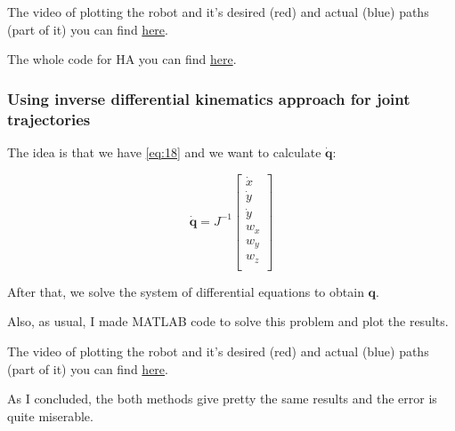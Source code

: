 \documentclass[12pt, a4paper]{report}
\begin{document}
The video of plotting the robot and it's desired (red) and actual (blue) paths (part of it) you can find \href{https://drive.google.com/open?id=1xH5_-XHiQtQv5W_jp0Rq1UXxTakYNbU7}{here}.

The whole code for HA you can find \href{https://github.com/Terminateit/HA3Dynamics-.git}{here}.

{\centering
\subsubsection*{Using inverse differential kinematics approach for joint trajectories}
}

The idea is that we have \ref{eq:18} and we want to calculate $\dot{\bm{q}}$:

\begin{equation}
        \dot{\bm{q}} = J^{-1}\begin{bmatrix}
                \dot{x}\\
                \dot{y}\\
                \dot{y} \\
                {w_x} \\
                {w_y} \\
                {w_z} \\
        \end{bmatrix}
\end{equation}

After that, we solve the system of differential equations to obtain ${\bm{q}}$.

Also, as usual, I made MATLAB code to solve this problem and plot the results. 

The video of plotting the robot and it's desired (red) and actual (blue) paths (part of it) you can find \href{https://drive.google.com/open?id=1SzXLqlq0qzzBGzvQZjL8gK2-DVrcIFDe}{here}.

As I concluded, the both methods give pretty the same results and the error is quite miserable.
\end{document}
